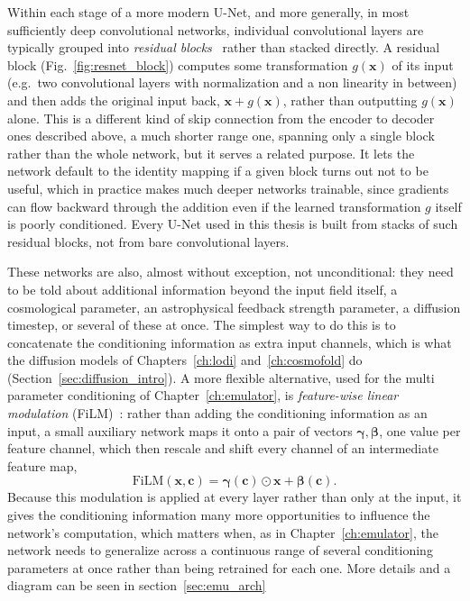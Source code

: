 Within each stage of a more modern U-Net, and more generally, in most sufficiently
deep convolutional networks, individual convolutional layers are
typically grouped into \emph{residual blocks}~\citep{he_deep_2015} rather
than stacked directly. A residual block (Fig.~\ref{fig:resnet_block}) computes some transformation
$g(\bm{x})$ of its input (e.g.\ two convolutional layers with
normalization and a non linearity in between) and then adds the original
input back, $\bm{x} + g(\bm{x})$, rather than outputting $g(\bm{x})$ alone.
This is a different kind of skip connection from the encoder to decoder
ones described above, a much shorter range one, spanning only a single
block rather than the whole network, but it serves a related purpose. It
lets the network default to the identity mapping if a given block turns
out not to be useful, which in practice makes much deeper networks
trainable, since gradients can flow backward through the addition even if
the learned transformation $g$ itself is poorly conditioned. Every U-Net
used in this thesis is built from stacks of such residual blocks, not from
bare convolutional layers.

These networks are also, almost without exception, not unconditional: they
need to be told about additional information beyond the input field itself, a cosmological parameter, an astrophysical feedback strength parameter, a
diffusion timestep, or several of these at once. The simplest way to do
this is to concatenate the conditioning information as extra input
channels, which is what the diffusion models of Chapters~\ref{ch:lodi}
and~\ref{ch:cosmofold} do (Section~\ref{sec:diffusion_intro}). A more
flexible alternative, used for the multi parameter conditioning of
Chapter~\ref{ch:emulator}, is \emph{feature-wise linear modulation}
(FiLM)~\citep{perez2017filmvisualreasoninggeneral}: rather than adding the
conditioning information as an input, a small auxiliary network maps it
onto a pair of vectors $\boldsymbol\gamma,\boldsymbol\beta$, one value per
feature channel, which then rescale and shift every channel of an
intermediate feature map,
\begin{equation}
    \mathrm{FiLM}(\bm{x},\bm{c}) = \boldsymbol\gamma(\bm{c})\odot\bm{x} + \boldsymbol\beta(\bm{c}).
    \label{eq:film}
\end{equation}
Because this modulation is applied at every layer rather than only at the
input, it gives the conditioning information many more opportunities to
influence the network's computation, which matters when, as in
Chapter~\ref{ch:emulator}, the network needs to generalize across a
continuous range of several conditioning parameters at once rather than
being retrained for each one. More details and a diagram can be seen in section~\ref{sec:emu_arch}

